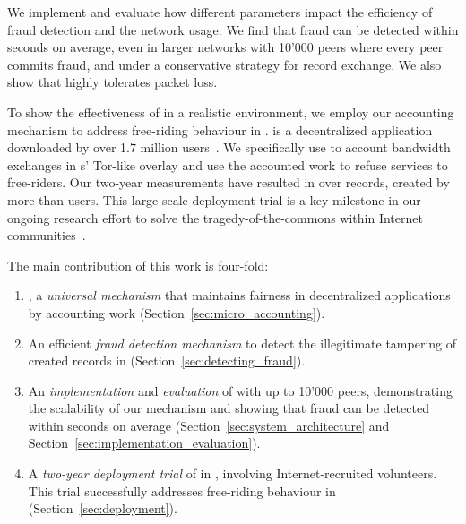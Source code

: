 We implement \TrustChain{} and evaluate how different parameters impact the efficiency of fraud detection and the network usage.
We find that fraud can be detected within seconds on average, even in larger networks with 10'000 peers where every peer commits fraud, and under a conservative strategy for record exchange.
We also show that \TrustChain{} highly tolerates packet loss.

To show the effectiveness of \TrustChain{} in a realistic environment, we employ our accounting mechanism to address free-riding behaviour in \Tribler{}.
\Tribler{} is a decentralized application downloaded by over 1.7 million users~\cite{pouwelse2008tribler}.
We specifically use \TrustChain{} to account bandwidth exchanges in \Tribler{}s' Tor-like overlay and use the accounted work to refuse services to free-riders.
Our two-year measurements have resulted in over \TrialRecords{} records, created by more than \TrialUsers{} users.
This large-scale deployment trial is a key milestone in our ongoing research effort to solve the tragedy-of-the-commons within Internet communities~\cite{de2018blockchain}.

The main contribution of this work is four-fold:
\begin{enumerate}
	\item \TrustChain{}, a \emph{universal mechanism} that maintains fairness in decentralized applications by accounting work (Section~\ref{sec:micro_accounting}).
	\item An efficient \emph{fraud detection mechanism} to detect the illegitimate tampering of created records in \TrustChain{} (Section~\ref{sec:detecting_fraud}).
	\item An \emph{implementation} and \emph{evaluation} of \TrustChain{} with up to 10'000 peers, demonstrating the scalability of our mechanism and showing that fraud can be detected within seconds on average (Section~\ref{sec:system_architecture} and Section~\ref{sec:implementation_evaluation}).
	\item A \emph{two-year deployment trial} of \TrustChain{} in \Tribler{}, involving \TrialUsers{} Internet-recruited volunteers. This trial successfully addresses free-riding behaviour in \Tribler{} (Section~\ref{sec:deployment}).
\end{enumerate}



